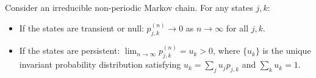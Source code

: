 Consider an irreducible non-periodic Markov chain. For any states $j, k$:
\begin{itemize}
\item If the states are transient or null: $p_{j,k}^{(n)} \to 0$ as $n \to \infty$ for all $j, k$.
\item If the states are persistent: $\lim_{n \to \infty} p_{j,k}^{(n)} = u_k > 0$, where $\{u_k\}$ is the unique invariant probability distribution satisfying $u_k = \sum_j u_j p_{j,k}$ and $\sum_k u_k = 1$.
\end{itemize}
